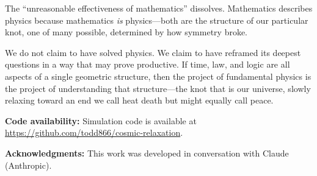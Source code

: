 \documentclass[11pt,a4paper]{article}
\begin{document}
The ``unreasonable effectiveness of mathematics'' dissolves. Mathematics describes physics because mathematics \emph{is} physics---both are the structure of our particular knot, one of many possible, determined by how symmetry broke.

We do not claim to have solved physics. We claim to have reframed its deepest questions in a way that may prove productive. If time, law, and logic are all aspects of a single geometric structure, then the project of fundamental physics is the project of understanding that structure---the knot that is our universe, slowly relaxing toward an end we call heat death but might equally call peace.

\vspace{0.5cm}
\noindent\textbf{Code availability:} Simulation code is available at \url{https://github.com/todd866/cosmic-relaxation}.

\vspace{0.5cm}
\noindent\textbf{Acknowledgments:} This work was developed in conversation with Claude (Anthropic).
\end{document}
